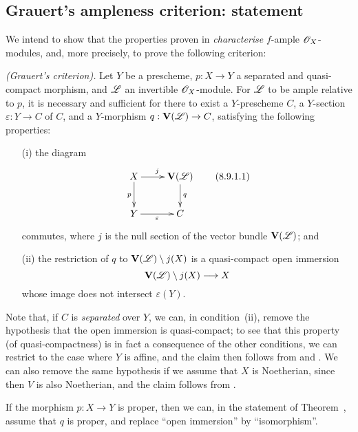 \subsection{Grauert's ampleness criterion: statement}
\label{subsection:II.8.9}

We intend to show that the properties proven in  \emph{characterise} $f$-ample $\mathscr{O}_X$-modules, and, more precisely, to prove the following criterion:
\begin{theorem}[8.9.1]
\label{II.8.9.1}
\emph{(Grauert's criterion).}
Let $Y$ be a prescheme, $p:X\to Y$ a separated and quasi-compact morphism, and $\mathscr{L}$ an invertible $\mathscr{O}_X$-module.
For $\mathscr{L}$ to be ample relative to $p$, it is necessary and sufficient for there to exist a $Y$-prescheme $C$, a $Y$-section $\varepsilon:Y\to C$ of $C$, and a $Y$-morphism $q:\bb{V}(\sh{L})\to C$, satisfying the following properties:
\begin{enumerate}
  \item[\rm{(i)}] the diagram
    \[
      \label{II.8.9.1.1}
        \xymatrix{
          X
            \ar[r]^{j}
            \ar[d]_{p}
        & \bb{V}(\sh{L})
            \ar[d]^{q}
        \\Y
            \ar[r]_{\varepsilon}
        & C
        }
      \tag{8.9.1.1}
    \]
    commutes, where $j$ is the null section of the vector bundle $\mathbf{V}(\mathscr{L})$; and
  \item[\rm{(ii)}] the restriction of $q$ to $\mathbf{V}(\mathscr{L})\setminus j(X)$ is a quasi-compact open immersion
    \[
      \bb{V}(\sh{L})\setminus j(X) \to X
    \]
    whose image does not intersect $\varepsilon(Y)$.
\end{enumerate}
\end{theorem}

Note that, if $C$ is \emph{separated} over $Y$, we can, in condition~(ii), remove the hypothesis that the open immersion is quasi-compact;
to see that this property (of quasi-compactness) is in fact a consequence of the other conditions, we can restrict to the case where $Y$ is affine, and the claim then follows from  and .
We can also remove
the same hypothesis if we assume that $X$ is Noetherian, since then $V$ is also Noetherian, and the claim follows from .

\begin{corollary}[8.9.2]
\label{II.8.9.2}
If the morphism $p:X\to Y$ is proper, then we can, in the statement of Theorem~, assume that $q$ is proper, and replace ``open immersion'' by ``isomorphism''.
\end{corollary}

